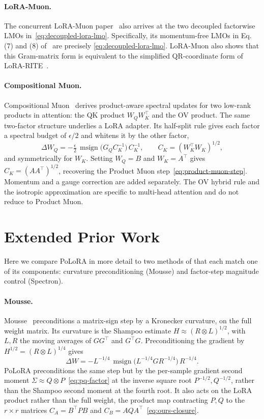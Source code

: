 \documentclass[11pt]{article}
\DeclareMathOperator{\msign}{msign}
\newcommand{\methodname}{PoLoRA\xspace}
\theoremstyle{plain}
\theoremstyle{definition}
\theoremstyle{remark}
\theoremstyle{definition}
\begin{document}
\paragraph{LoRA-Muon.}
The concurrent LoRA-Muon paper~\cite{loramuon} also arrives at the two decoupled
factorwise LMOs in~\eqref{eq:decoupled-lora-lmo}.
Specifically, its momentum-free LMOs in Eq. (7) and (8) of~\cite{loramuon} are precisely \eqref{eq:decoupled-lora-lmo}.
LoRA-Muon also shows that this
Gram-matrix form is equivalent to the simplified QR-coordinate form of
LoRA-RITE~\cite{loramuon}.


\paragraph{Compositional Muon.}
Compositional Muon~\cite{tilde_csd} derives product-aware spectral updates for two low-rank products in attention: the QK product $W_QW_K^\top$ and the OV product. The same two-factor structure underlies a LoRA adapter. Its half-split rule gives each factor a spectral budget of $\epsilon/2$ and whitens it by the other factor,
\[
  \Delta W_Q=-\tfrac{\epsilon}{2}\,\msign\!\big(G_Q C_K^{-1}\big)\,C_K^{-1},
  \qquad C_K=(W_K^\top W_K)^{1/2},
\]
and symmetrically for $W_K$. Setting $W_Q=B$ and $W_K=A^\top$ gives $C_K=(AA^\top)^{1/2}$, recovering the Product Muon step~\eqref{eq:product-muon-step}. Momentum and a gauge correction are added separately. The OV hybrid rule and the isotropic approximation are specific to multi-head attention and do not reduce to Product Muon.


\section{Extended Prior Work}
\label{app:related-spectral}
Here we compare \methodname{} in more detail to two methods of  that each
match one of its components: curvature preconditioning (Mousse) and factor-step magnitude
control (Spectron).

\paragraph{Mousse.}
Mousse~\cite{mousse} preconditions a matrix-sign step by a Kronecker curvature, on the full
weight matrix. Its curvature is the Shampoo estimate $H\approx(R\otimes L)^{1/2}$, with $L,R$
the moving averages of $GG^\top$ and $G^\top G$. Preconditioning the gradient by
$H^{1/2}=(R\otimes L)^{1/4}$ gives
\[
  \Delta W=-L^{-1/4}\,\msign\!\big(L^{-1/4} G R^{-1/4}\big)\,R^{-1/4}.
\]
\methodname{} preconditions the same step but by the per-sample gradient second moment
$\Sigma\approx Q\otimes P$~\eqref{eq:pq-factor} at the inverse square root $P^{-1/2},Q^{-1/2}$,
rather than the Shampoo second moment at the fourth root. It also acts on the LoRA product
rather than the full weight, the product map contracting $P,Q$ to the $r\times r$ matrices
$C_A=B^\top P B$ and $C_B=AQA^\top$~\eqref{eq:ours-closure}.
\end{document}
